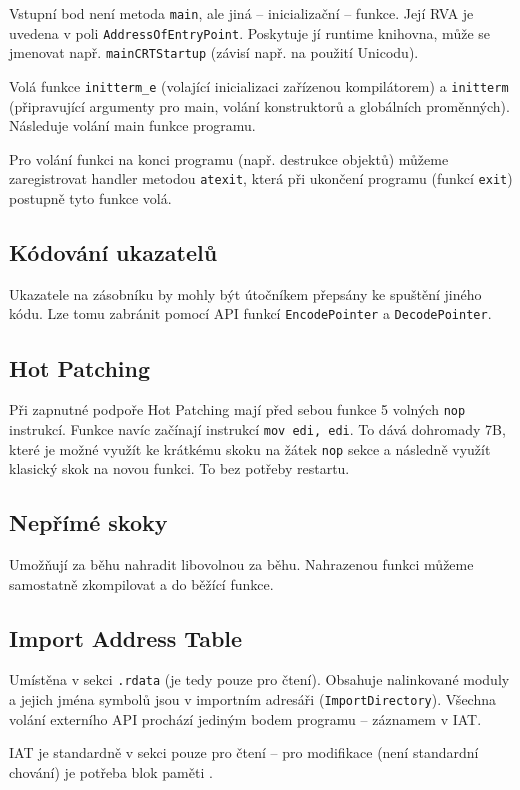 Vstupní bod není metoda \texttt{main}, ale jiná -- inicializační -- funkce.
Její RVA je uvedena v poli \texttt{AddressOfEntryPoint}.
Poskytuje jí runtime knihovna, může se jmenovat např. \texttt{mainCRTStartup} (závisí např. na použití Unicodu).

Volá funkce \texttt{initterm\_e} (volající inicializaci zařízenou kompilátorem) a \texttt{initterm} (připravující argumenty pro main, volání konstruktorů a globálních proměnných).
Následuje volání main funkce programu.

Pro volání funkci na konci programu (např. destrukce objektů) můžeme zaregistrovat handler metodou \texttt{atexit}, která při ukončení programu (funkcí \texttt{exit}) postupně tyto funkce volá.

\subsection*{Kódování ukazatelů}

Ukazatele na zásobníku by mohly být útočníkem přepsány ke spuštění jiného kódu.
Lze tomu zabránit pomocí API funkcí \texttt{EncodePointer} a \texttt{DecodePointer}.

\subsection*{Hot Patching}

Při zapnutné podpoře Hot Patching mají před sebou funkce 5 volných \texttt{nop} instrukcí.
Funkce navíc začínají  instrukcí \texttt{mov edi, edi}.
To dává dohromady 7B, které je možné využít ke krátkému skoku na žátek \texttt{nop} sekce a následně využít klasický skok na novou funkci.
To bez potřeby restartu.

\subsection*{Nepřímé skoky}

Umožňují za běhu nahradit libovolnou za běhu.
Nahrazenou funkci můžeme samostatně zkompilovat a  do běžící funkce.

\subsection*{Import Address Table}

Umístěna v sekci \texttt{.rdata} (je tedy pouze pro čtení).
Obsahuje nalinkované moduly a jejich jména symbolů jsou v importním adresáři (\texttt{ImportDirectory}).
Všechna volání externího API prochází jediným bodem programu -- záznamem v IAT.

IAT je standardně v sekci pouze pro čtení -- pro modifikace (není standardní chování) je potřeba blok paměti .
